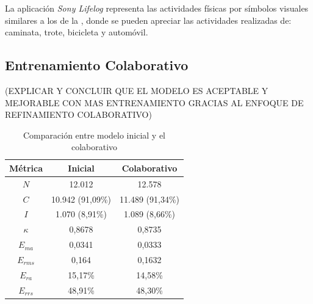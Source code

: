 La aplicación \emph{Sony Lifelog} representa las actividades físicas
por símbolos visuales similares a los de la ,
donde se pueden apreciar las actividades realizadas de: caminata,
trote, bicicleta y automóvil.

\subsection{Entrenamiento Colaborativo}

(EXPLICAR Y CONCLUIR QUE EL MODELO ES ACEPTABLE Y MEJORABLE CON MAS
ENTRENAMIENTO GRACIAS AL ENFOQUE DE REFINAMIENTO COLABORATIVO)

\begin{table}[H]
\begin{centering}
\begin{tabular}{|c|c|c|}
\hline 
Métrica & Inicial & Colaborativo\tabularnewline
\hline 
\hline 
$N$ & 12.012 & 12.578\tabularnewline
\hline 
$C$ & 10.942 (91,09\%) & 11.489 (91,34\%)\tabularnewline
\hline 
$I$ & 1.070 (8,91\%) & 1.089 (8,66\%)\tabularnewline
\hline 
$\kappa$ & 0,8678 & 0,8735\tabularnewline
\hline 
$E_{ma}$ & 0,0341 & 0,0333\tabularnewline
\hline 
$E_{rms}$ & 0,164 & 0,1632\tabularnewline
\hline 
$E_{ra}$ & 15,17\% & 14,58\%\tabularnewline
\hline 
$E_{rrs}$ & 48,91\% & 48,30\%\tabularnewline
\hline 
\end{tabular}
\par\end{centering}
\caption{\label{tab6:comparacion-clasi}Comparación entre modelo inicial y
el colaborativo}
\end{table}

